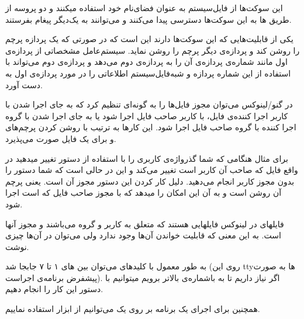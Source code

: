 این سوکت‌ها از فایل‌سیستم به عنوان فضای‌نام خود استفاده میکنند و دو پروسه از طریق ها به این سوکت‌ها دسترسی پیدا می‌کنند و می‌توانند به یک‌دیگر پیغام بفرستند.

یکی از قابلیت‌هایی که این سوکت‌ها دارند این است که در صورتی که یک پردازه پرچم  را روشن کند و پردازه‌ی دیگر پرچم  را روشن نماید. سیستم‌عامل مشخصاتی از پردازه‌ی اول مانند شماره‌ی پردازه‌ی آن را به پردازه‌ی دوم می‌دهد و پردازه‌ی دوم می‌تواند با استفاده از این شماره پردازه و شبه‌فایل‌سیستم  اطلاعاتی را در مورد پردازه‌ی اول به دست آورد.


در گنو/لینوکس می‌توان مجوز فایل‌ها را به گونه‌ای تنظیم کرد که به جای اجرا شدن با کاربر اجرا کننده‌ی فایل، با کاربر صاحب فایل اجرا شود یا به جای اجرا شدن با گروه اجرا کننده با گروه صاحب فایل اجرا شود. این کارها به ترتیب با روشن کردن پرچم‌های  و  برای یک فایل صورت می‌پذیرد. 

برای مثال هنگامی که شما گذرواژه‌ی کاربری را با استفاده از دستور  تغییر میدهید در واقع فایل  که صاحب آن کاربر  است تغییر می‌کند و این در حالی است که شما دستور  را بدون مجوز کاربر  انجام می‌دهید. دلیل کار کردن این دستور مجوز آن است. یعنی پرچم  آن روشن است و به آن این امکان را میدهد که با مجوز صاحب فایل که  است اجرا شود.


فایلهای  در لینوکس فایلهایی هستند که متعلق به کاربر  و گروه  می‌باشند و مجوز آنها  است. به این معنی که قابلیت خواندن آن‌ها وجود ندارد ولی می‌توان در آن‌ها چیزی نوشت. 

به طور معمول با کلید‌های  می‌توان بین های ۱ تا ۷ جابجا شد (روی این ttyها به صورت پیشفرض برنامه‌ی  اجراست). اگر نیاز داریم تا به  باشماره‌ی بالاتر برویم میتوانیم با دستور  این کار را انجام دهیم.

همچنین برای اجرای یک برنامه بر روی یک  می‌توانیم از ابزار  استفاده نماییم.




